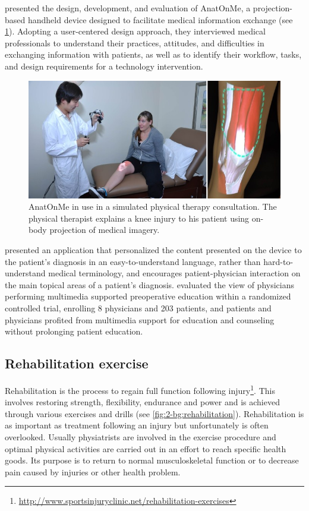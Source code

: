\citet{Ni2011} presented the design, development, and evaluation of AnatOnMe, a projection-based handheld device designed to facilitate medical information exchange (see \figurename{\ref{fig:2-bg:AnatOnMe-projection-basedhandhelddevice}}). Adopting a user-centered design approach, they interviewed medical professionals to understand their practices, attitudes, and difficulties in exchanging information with patients, as well as to identify their workflow, tasks, and design requirements for a technology intervention.
\begin{figure}
\centering
\includegraphics[width=0.85\linewidth]{"figures/2-bg/AnatOnMe-projection-based handheld device"}
\caption{AnatOnMe in use in a simulated physical therapy consultation. The physical therapist explains a knee injury to his patient using on-body projection of medical imagery.}
\label{fig:2-bg:AnatOnMe-projection-basedhandhelddevice}
\end{figure}

\citet{Gonzales2012} presented an application that personalized the content presented on the device to the patient's diagnosis in an easy-to-understand language, rather than hard-to-understand medical terminology, and encourages patient-physician interaction on the main topical areas of a patient's diagnosis.
\citet{Ihrig2012} evaluated the view of physicians performing multimedia supported preoperative education within a randomized controlled trial, enrolling 8 physicians and 203 patients, and patients and physicians profited from multimedia support for education and counseling without prolonging patient education. 


\subsection{Rehabilitation exercise}
Rehabilitation is the process to regain full function following injury\footnote{\url{http://www.sportsinjuryclinic.net/rehabilitation-exercises}}. This involves restoring strength, flexibility, endurance and power and is achieved through various exercises and drills (see \figurename{\ref{fig:2-bg:rehabilitation}}). Rehabilitation is as important as treatment following an injury but unfortunately is often overlooked. Usually physiatrists are involved in the exercise procedure and optimal physical activities are carried out in an effort to reach specific health goods. Its purpose is to return to normal musculoskeletal function or to decrease pain caused by injuries or other health problem. 

